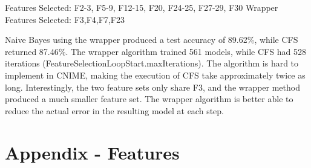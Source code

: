 \documentclass[11pt]{article}
\begin{document}
Features Selected: F2-3, F5-9, F12-15, F20, F24-25, F27-29, F30
Wrapper Features Selected: F3,F4,F7,F23

Naive Bayes using the wrapper produced a test accuracy of 89.62\%, while CFS returned 87.46\%. The wrapper algorithm trained 561 models, while CFS had 528 iterations (FeatureSelectionLoopStart.maxIterations). The algorithm is hard to implement in CNIME, making the execution of CFS take approximately twice as long. Interestingly, the two feature sets only share F3, and the wrapper method produced a much smaller feature set. The wrapper algorithm is better able to reduce the actual error in the resulting model at each step.
\printbibliography

\section{Appendix - Features} \label{app.features}
\end{document}
